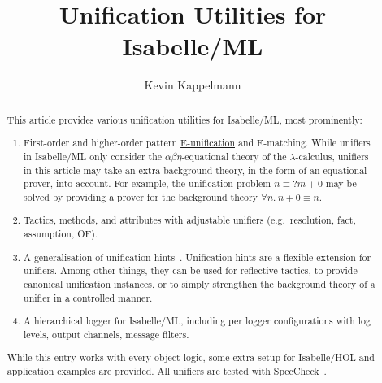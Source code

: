 \documentclass[11pt,a4paper]{article}
\begin{document}
\title{Unification Utilities for Isabelle/ML}
\author{Kevin Kappelmann}
\maketitle

\begin{abstract}
This article provides various unification utilities for Isabelle/ML, most prominently:
\begin{enumerate}
\item First-order and higher-order pattern
\href{https://en.wikipedia.org/wiki/Unification_(computer_science)#E-unification}{E-unification}
and E-matching.
While unifiers in Isabelle/ML only consider the $\alpha\beta\eta$-equational theory of the $\lambda$-calculus,
unifiers in this article
may take an extra background theory, in the form of an equational prover, into account.
For example, the unification problem $n \equiv {}?m + 0$
may be solved by providing a prover for the background theory $\forall n.\ n + 0 \equiv n$.
\item Tactics, methods, and attributes with adjustable unifiers (e.g.\ resolution, fact, assumption, OF).
\item A generalisation of unification hints~\cite{unif-hints}.
Unification hints are a flexible extension for unifiers.
Among other things, they can be used for reflective tactics,
to provide canonical unification instances,
or to simply strengthen the background theory of a unifier in a controlled manner.
\item A hierarchical logger for Isabelle/ML,
including per logger configurations with log levels, output channels, message filters.
\end{enumerate}
While this entry works with every object logic,
some extra setup for Isabelle/HOL and application examples are provided.
All unifiers are tested with SpecCheck~\cite{speccheck}.
\end{abstract}

\tableofcontents





\end{document}
